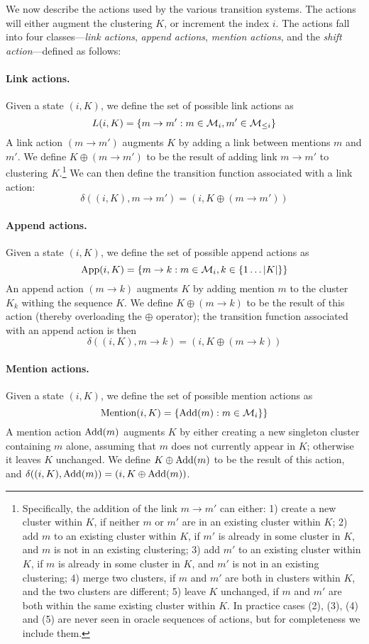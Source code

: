 \documentclass[11pt,a4paper]{article}
\begin{document}
We now describe the actions used by the various transition systems. The actions will either augment the clustering $K$, or increment the index $i$. The actions fall into four classes---{\em link actions}, {\em append actions}, {\em mention actions}, and the {\em shift action}---defined as follows:


\paragraph{Link actions.}
Given a state $(i, K)$, we define the set of possible link actions as
\[
L(i, K) = 
\{m \rightarrow m' : m \in {\cal M}_i, m' \in {\cal M}_{\leq i}\}
\]
A link action $(m \rightarrow m')$ augments $K$ by adding a link between mentions $m$ and $m'$. We define $K \oplus (m \rightarrow m')$ to be the result of adding link $m \rightarrow m'$ to clustering $K$.\footnote{Specifically, the addition of the link $m \rightarrow m'$ can either: 1) create a new cluster within $K$, if neither $m$ or $m'$ are in an existing cluster within $K$; 2) add $m$ to an existing cluster within $K$, if $m'$ is already in some cluster in $K$, and $m$ is not in an existing clustering; 3) add $m'$ to an existing cluster within $K$, if $m$ is already in some cluster in $K$, and $m'$ is not in an existing clustering; 4) merge two clusters, if $m$ and $m'$ are both in clusters within $K$, and the two clusters are different; 5) leave $K$ unchanged, if $m$ and $m'$ are both within the same existing cluster within $K$. In practice cases (2), (3), (4) and (5) are never seen in oracle sequences of actions, but for completeness we include them.}
We can then define the transition function associated with a link action:
\[
\delta((i,K), m \rightarrow m') = (i, K \oplus (m \rightarrow m'))
\]

\paragraph{Append actions.}
Given a state $(i, K)$, we define the set of possible append actions as
\[
\hbox{App}(i, K) = 
\{m \rightarrow k : m \in {\cal M}_i, k \in \{1 \ldots |K|\}\}
\]
An append action $(m \rightarrow k)$ augments $K$ by adding mention $m$ to the cluster $K_k$ withing the sequence $K$. We define $K \oplus (m \rightarrow k)$ to be the result of this action (thereby overloading the $\oplus$ operator); the transition function associated with an append action is then
\[
\delta((i,K), m \rightarrow k) = (i, K \oplus (m \rightarrow k))
\]

\paragraph{Mention actions.}
Given a state $(i, K)$, we define the set of possible mention actions as
\[
\hbox{Mention}(i, K) = 
\{\hbox{Add}(m) : m \in {\cal M}_i\}\}
\]
A mention action $\hbox{Add}(m)$ augments $K$ by either creating a new singleton cluster containing $m$ alone, assuming that $m$ does not currently appear in $K$; otherwise it leaves $K$ unchanged. We define $K \oplus \hbox{Add}(m)$  to be the result of this action, and $\delta((i,K), \hbox{Add}(m)) = (i, K \oplus \hbox{Add}(m))$.
\end{document}
